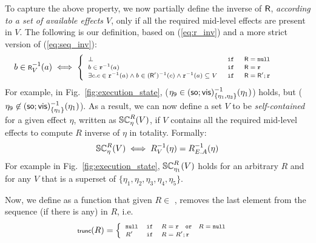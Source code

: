 To capture the above property, we now partially define the 
inverse of ${\normalfont \textsf{R}}$, \emph{according to a set of available effects $V$}, 
only if all the required mid-level effects are present in $V$.
The following is our definition, based on (\ref{eq:r_inv}) and a more
strict
version of (\ref{eq:seq_inv}):
\begin{equation}
\label{eq:R_inv}
\scriptsize
b \in {\normalfont \textsf{R}}^{-1}_V(a) \iff
\begin{cases}
\begin{array} {lllll} 
\bot & \;\mathtt {if}\; & {\normalfont \textsf{R}} = \mathtt{null}& & \\
b \in \mathtt{r}^{-1}(a) & \;\mathtt {if}\; & {\normalfont \textsf{R}}=\mathtt{r} & & \\
\exists c. c \in
\mathtt{r}^{-1}(a) \wedge b \in ({\normalfont \textsf{R}}')^{-1}(c) \wedge
\mathtt{r}^{-1}(a) \subseteq V   & \;\mathtt {if}\; & {\normalfont \textsf{R}}={\normalfont \textsf{R}}';\mathtt{r} & & \;
\end{array}
\end{cases}
\end{equation}
For example, in Fig.~\ref{fig:execution_state}, 
{\footnotesize  ($\eta_9 \in
({\textsf{so}};{\normalfont \textsf{vis}})_{\{\eta_1,\eta_3\}}^{-1}(\eta_1)$)}
holds, but {\footnotesize($\eta_9 \not\in ({\textsf{so}};{\normalfont \textsf{vis}})_{\{\eta_1\}}^{-1}(\eta_1)$)}. 
As a result, we can now define a set $V$ to be \emph{self-contained} for
a given effect $\eta$,
written as {\footnotesize $\SC
R \eta V$}, if $V$ contains all the required mid-level effects to compute
$R$ inverse of $\eta$ in totality. Formally:
\begin{equation}
\scriptsize 
\SC R \eta {V} \iff R^{-1}_V(\eta) = R^{-1}_{E.A}(\eta)
\end{equation}
For example in Fig.~\ref{fig:execution_state}, {\footnotesize $\SC R
{\eta_1} V$} holds for an arbitrary  $R$ and for any $V$ that is a superset of
{\footnotesize $\{\eta_1,\eta_2,\eta_3,\eta_4,\eta_5\}$}.

Now, we define \trunc{} as a function that
given  $R \in$ \relationS{}, removes the last element from the
sequence (if there is any) in $R$, i.e.
\begin{equation}
\scriptsize
\trunc{R} = 
\begin{cases}
\begin{array}{lcl}
\nullR & \myif & R = \rel \quad \mathtt{or} \quad R = \nullR \\
R' & \myif & R = R';\rel 
\end{array}
\end{cases}
\end{equation}

